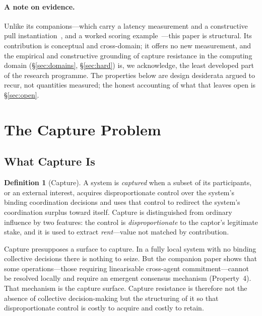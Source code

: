 \documentclass[11pt]{article}
\theoremstyle{definition}
\newtheorem{definition}{Definition}
\theoremstyle{plain}
\begin{document}
\paragraph{A note on evidence.} Unlike its companions---which carry a latency
measurement and a constructive pull instantiation~\cite{nicholson2026hlks}, and a
worked scoring example~\cite{nicholson2025}---this paper is structural. Its
contribution is conceptual and cross-domain; it offers no new measurement, and the
empirical and constructive grounding of capture resistance in the computing domain
(\S\ref{sec:domains}, \S\ref{sec:hard}) is, we acknowledge, the least developed part
of the research programme. The properties below are design desiderata argued to
recur, not quantities measured; the honest accounting of what that leaves open is
\S\ref{sec:open}.

\section{The Capture Problem}
\label{sec:problem}

\subsection{What Capture Is}

\begin{definition}[Capture]
A system is \emph{captured} when a subset of its participants, or an external
interest, acquires disproportionate control over the system's binding coordination
decisions and uses that control to redirect the system's coordination surplus
toward itself. Capture is distinguished from ordinary influence by two features:
the control is \emph{disproportionate} to the captor's legitimate stake, and it
is used to extract \emph{rent}---value not matched by contribution.
\end{definition}

Capture presupposes a surface to capture. In a fully local system with no binding
collective decisions there is nothing to seize. But the companion paper shows that
some operations---those requiring linearisable cross-agent commitment---cannot be
resolved locally and require an emergent consensus mechanism (Property~4). That
mechanism is the capture surface. Capture resistance is therefore not the absence
of collective decision-making but the structuring of it so that disproportionate
control is costly to acquire and costly to retain.
\end{document}

